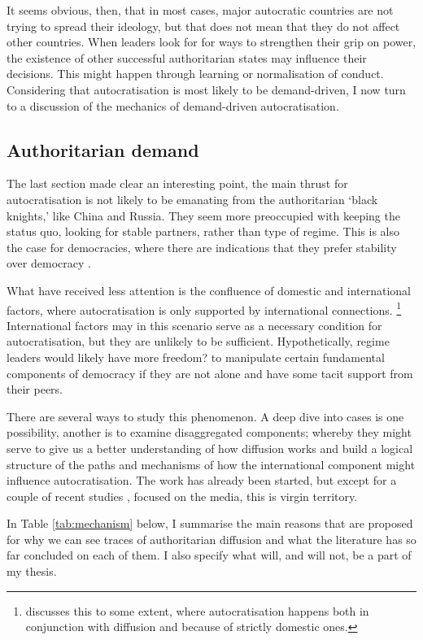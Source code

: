 It seems obvious, then, that in most cases, major autocratic countries are not trying to spread their ideology, but that does not mean that they do not affect other countries. When leaders look for for ways to strengthen their grip on power, the existence of other successful authoritarian states may influence their decisions. This might happen through learning or normalisation of conduct. Considering that autocratisation is most likely to be demand-driven, I now turn to a discussion of the mechanics of demand-driven autocratisation.

\subsection{Authoritarian demand}
The last section made clear an interesting point, the main thrust for autocratisation is not likely to be emanating from the authoritarian `black knights,' like China and Russia. They seem more preoccupied with keeping the status quo, looking for stable partners, rather than type of regime. This is also the case for democracies, where there are indications that they prefer stability over democracy \citep{hassan_undermining_2015, risse_democracy_2015}.

What have received less attention is the confluence of domestic and international factors, where autocratisation is only supported by international connections. \footnote{\citet{buzogany_illiberal_2017} discusses this to some extent, where autocratisation happens both in conjunction with diffusion and because of strictly domestic ones.} International factors may in this scenario serve as a necessary condition for autocratisation, but they are unlikely to be sufficient. Hypothetically, regime leaders would likely have more freedom? to manipulate certain fundamental components of democracy if they are not alone and have some tacit support from their peers. 

There are several ways to study this phenomenon. A deep dive into cases is one possibility, another is to examine disaggregated components; whereby they might serve to give us a better understanding of how diffusion works and build a logical structure of the paths and mechanisms of how the international component might influence autocratisation. The work has already been started, but except for a couple of recent studies \citep{gamso_is_2021, toettoe_foreign_2023}, focused on the media, this is virgin territory. 

In Table \ref{tab:mechanism} below, I summarise the main reasons that are proposed for why we can see traces of authoritarian diffusion and what the literature has so far concluded on each of them. I also specify what will, and will not, be a part of my thesis.

